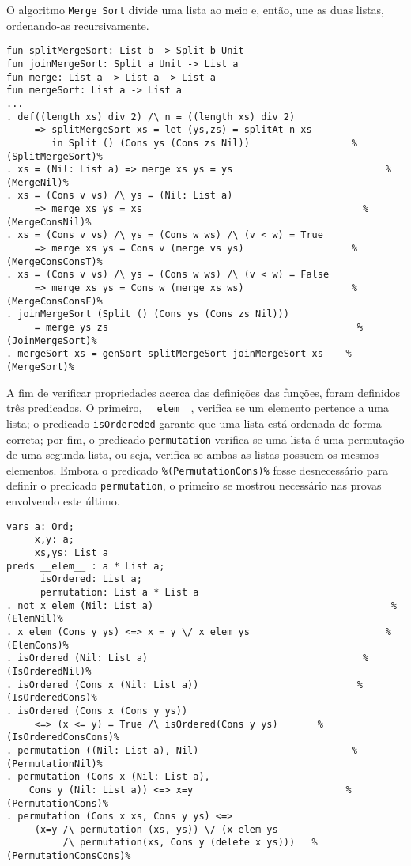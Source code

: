 O algoritmo \Verb.Merge Sort. divide uma lista ao meio e, então, une as duas listas, ordenando-as recursivamente.

\begin{Verbatim}
fun splitMergeSort: List b -> Split b Unit
fun joinMergeSort: Split a Unit -> List a
fun merge: List a -> List a -> List a
fun mergeSort: List a -> List a
...
. def((length xs) div 2) /\ n = ((length xs) div 2) 
     => splitMergeSort xs = let (ys,zs) = splitAt n xs
        in Split () (Cons ys (Cons zs Nil))                  %(SplitMergeSort)%
. xs = (Nil: List a) => merge xs ys = ys                           %(MergeNil)%
. xs = (Cons v vs) /\ ys = (Nil: List a) 
     => merge xs ys = xs                                       %(MergeConsNil)%
. xs = (Cons v vs) /\ ys = (Cons w ws) /\ (v < w) = True 
     => merge xs ys = Cons v (merge vs ys)                   %(MergeConsConsT)%
. xs = (Cons v vs) /\ ys = (Cons w ws) /\ (v < w) = False 
     => merge xs ys = Cons w (merge xs ws)                   %(MergeConsConsF)%
. joinMergeSort (Split () (Cons ys (Cons zs Nil))) 
     = merge ys zs                                            %(JoinMergeSort)%
. mergeSort xs = genSort splitMergeSort joinMergeSort xs    %(MergeSort)%
\end{Verbatim}

A fim de verificar propriedades acerca das definições das funções, foram definidos três predicados.
O primeiro, \Verb.__elem__., verifica se um elemento pertence a uma lista;
o predicado \Verb.isOrdereded. garante que uma lista está ordenada de forma correta;
por fim, o predicado \Verb.permutation. verifica se uma lista é uma permutação de uma segunda lista, ou seja, verifica se ambas as listas possuem os mesmos elementos.
Embora o predicado \Verb.%

\begin{Verbatim}
vars a: Ord;
     x,y: a;
     xs,ys: List a
preds __elem__ : a * List a;
      isOrdered: List a;
      permutation: List a * List a
. not x elem (Nil: List a)                                          %(ElemNil)%
. x elem (Cons y ys) <=> x = y \/ x elem ys                        %(ElemCons)%
. isOrdered (Nil: List a)                                      %(IsOrderedNil)%
. isOrdered (Cons x (Nil: List a))                            %(IsOrderedCons)%
. isOrdered (Cons x (Cons y ys))                    
     <=> (x <= y) = True /\ isOrdered(Cons y ys)       %(IsOrderedConsCons)%
. permutation ((Nil: List a), Nil)                           %(PermutationNil)%
. permutation (Cons x (Nil: List a),                
 	Cons y (Nil: List a)) <=> x=y                           %(PermutationCons)%
. permutation (Cons x xs, Cons y ys) <=>            
     (x=y /\ permutation (xs, ys)) \/ (x elem ys    
          /\ permutation(xs, Cons y (delete x ys)))   %(PermutationConsCons)%
\end{Verbatim}

